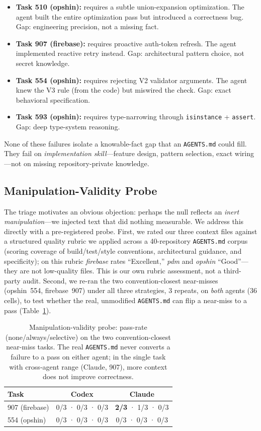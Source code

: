 \documentclass[11pt]{article}
\newcommand{\agentsmd}{\texttt{AGENTS.md}}
\begin{document}
\begin{itemize}
    \item \textbf{Task 510 (opshin):} requires a subtle union-expansion optimization. The agent built the entire optimization pass but introduced a correctness bug. Gap: engineering precision, not a missing fact.
    \item \textbf{Task 907 (firebase):} requires proactive auth-token refresh. The agent implemented reactive retry instead. Gap: architectural pattern choice, not secret knowledge.
    \item \textbf{Task 554 (opshin):} requires rejecting V2 validator arguments. The agent knew the V3 rule (from the code) but miswired the check. Gap: exact behavioral specification.
    \item \textbf{Task 593 (opshin):} requires type-narrowing through \texttt{isinstance} + \texttt{assert}. Gap: deep type-system reasoning.
\end{itemize}

None of these failures isolate a knowable-fact gap that an \agentsmd{} could fill.
They fail on \emph{implementation skill}---feature design, pattern selection, exact wiring---not on missing repository-private knowledge.
\label{sec:triage}

\subsection{Manipulation-Validity Probe}
\label{sec:probe}

The triage motivates an obvious objection: perhaps the null reflects an \emph{inert manipulation}---we injected text that did nothing measurable.
We address this directly with a pre-registered probe.
First, we rated our three context files against a structured quality rubric we applied across a 40-repository \agentsmd{} corpus (scoring coverage of build/test/style conventions, architectural guidance, and specificity); on this rubric \emph{firebase} rates ``Excellent,'' \emph{pdm} and \emph{opshin} ``Good''---they are not low-quality files. This is our own rubric assessment, not a third-party audit.
Second, we re-ran the two convention-closest near-misses (opshin~554, firebase~907) under all three strategies, 3 repeats, on \emph{both} agents (36 cells), to test whether the real, unmodified \agentsmd{} can flip a near-miss to a pass (Table~\ref{tab:probe}).

\begin{table}[t]
\centering
\small
\caption{Manipulation-validity probe: pass-rate (none/always/selective) on the two convention-closest near-miss tasks. The real \agentsmd{} never converts a failure to a pass on either agent; in the single task with cross-agent range (Claude, 907), more context does not improve correctness.}
\label{tab:probe}
\begin{tabular}{lcc}
\toprule
\textbf{Task} & \textbf{Codex} & \textbf{Claude} \\
\midrule
907 (firebase) & 0/3 · 0/3 · 0/3 & \textbf{2/3} · 1/3 · 0/3 \\
554 (opshin)   & 0/3 · 0/3 · 0/3 & 0/3 · 0/3 · 0/3 \\
\bottomrule
\end{tabular}
\end{table}
\end{document}
